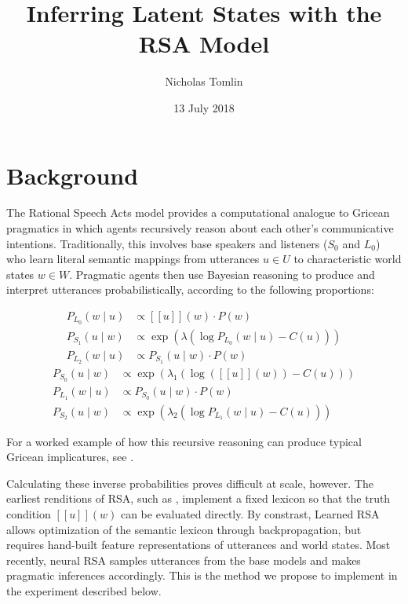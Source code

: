 \documentclass{article}
\title{Inferring Latent States with the RSA Model}
\author{Nicholas Tomlin}
\date{13 July 2018}
\begin{document}
	\maketitle
	
\section{Background}

The Rational Speech Acts model \citep{frank2012predicting, goodman2013knowledge} provides a computational analogue to Gricean pragmatics in which agents recursively reason about each other's communicative intentions. Traditionally, this involves base speakers and listeners ($S_0$ and $L_0$) who learn literal semantic mappings from utterances $u \in U$ to characteristic world states $w \in W$. Pragmatic agents then use Bayesian reasoning to produce and interpret utterances probabilistically, according to the following proportions:
\begin{multicols}{2}
\noindent 
	\begin{align*}
		P_{L_0}(w \mid u) &\propto [[u]](w) \cdot P(w) \\
		P_{S_1}(u \mid w) &\propto \exp(\lambda(\log P_{L_0}(w \mid u) - C(u))) \\
		P_{L_2}(w \mid u) &\propto P_{S_1}(u \mid w) \cdot P(w)
	\end{align*}
	\begin{align*}
		P_{S_0}(u \mid w) &\propto \exp(\lambda_1(\log ([[u]](w)) - C(u))) \\
		P_{L_1}(w \mid u) &\propto P_{S_0}(u \mid w) \cdot P(w) \\
		P_{S_2}(u \mid w) &\propto \exp(\lambda_2(\log P_{L_1}(w \mid u) - C(u)))
	\end{align*}
\end{multicols}
\noindent For a worked example of how this recursive reasoning can produce typical Gricean implicatures, see \citet{monroe2015learning}.

Calculating these inverse probabilities proves difficult at scale, however. The earliest renditions of RSA, such as \citet{smith2013learning}, implement a fixed lexicon so that the truth condition $[[u]](w)$ can be evaluated directly. By constrast, Learned RSA \citep{monroe2015learning} allows optimization of the semantic lexicon through backpropagation, but requires hand-built feature representations of utterances and world states. Most recently, neural RSA \citep{andreas2016reasoning, monroe2017colors, fried2017unified} samples utterances from the base models and makes pragmatic inferences accordingly. This is the method we propose to implement in the experiment described below.
\end{document}
